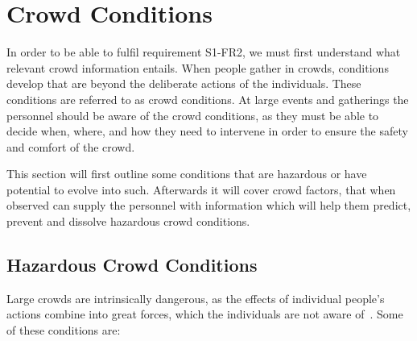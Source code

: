 \section{Crowd Conditions}\label{sec:related_work}
In order to be able to fulfil requirement S1-FR2, we must first understand what relevant crowd information entails. When people gather in crowds, conditions develop that are beyond the deliberate actions of the individuals. These conditions are referred to as crowd conditions. At large events and gatherings the personnel should be aware of the crowd conditions, as they must be able to decide when, where, and how they need to intervene in order to ensure the safety and comfort of the crowd.

This section will first outline some conditions that are hazardous or have potential to evolve into such. Afterwards it will cover crowd factors, that when observed can supply the personnel with information which will help them predict, prevent and dissolve hazardous crowd conditions.

\subsection{Hazardous Crowd Conditions}
Large crowds are intrinsically dangerous, as the effects of individual people's actions combine into great forces, which the individuals are not aware of~\cite{website:Wikipedia-Hajj}. Some of these conditions are:

